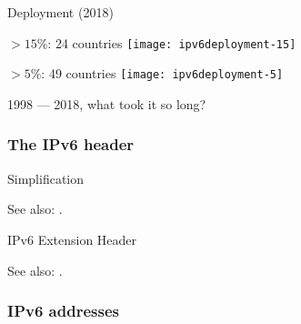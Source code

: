\begin{frame}{Deployment (2018)}
  \begin{minipage}{.48\linewidth}
    \begin{iblock}{\(>15\%\): 24 countries}
      \texttt{[image: ipv6deployment-15]}
    \end{iblock}
  \end{minipage}
  \begin{minipage}{.48\linewidth}
    \begin{iblock}{\(>5\%\): 49 countries}
      \texttt{[image: ipv6deployment-5]}
    \end{iblock}
  \end{minipage}
  \begin{refsection}
    \nocite{rfc2460} \printbibliography[heading=none]
  \end{refsection}
  1998 --- 2018, what took it so long?
\end{frame}

\subsubsection{The IPv6 header}

\begin{frame}{Simplification}
  \centering
  \mode<beamer>{ \texttt{[image: hdrs]} }%
\end{frame}

See also: .

\begin{frame}{IPv6 Extension Header}
  \begin{center}
  \end{center}
\end{frame}

See also: .

\subsubsection{IPv6 addresses}

